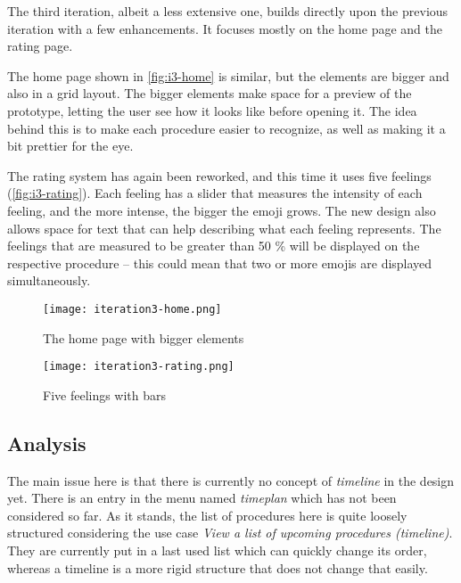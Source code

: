 The third iteration, albeit a less extensive one, builds directly upon the previous iteration with a few enhancements. It focuses mostly on the home page and the rating page.

The home page shown in \autoref{fig:i3-home} is similar, but the elements are bigger and also in a grid layout. The bigger elements make space for a preview of the prototype, letting the user see how it looks like before opening it. The idea behind this is to make each procedure easier to recognize, as well as making it a bit prettier for the eye.

The rating system has again been reworked, and this time it uses five feelings (\autoref{fig:i3-rating}). Each feeling has a slider that measures the intensity of each feeling, and the more intense, the bigger the emoji grows. The new design also allows space for text that can help describing what each feeling represents. The feelings that are measured to be greater than 50 \% will be displayed on the respective procedure -- this could mean that two or more emojis are displayed simultaneously.

\begin{sidewaysfigure}
    \centering
    \hspace{\fill}
    \begin{minipage}{0.4\textwidth}
        \centering
        \texttt{[image: iteration3-home.png]}
        \caption{The home page with bigger elements}
        \label{fig:i3-home}
    \end{minipage}
    \hspace{\fill}
    \begin{minipage}{0.4\textwidth}
        \centering
        \texttt{[image: iteration3-rating.png]}
        \caption{Five feelings with bars}
        \label{fig:i3-rating}
    \end{minipage}
    \hspace*{\fill}
\end{sidewaysfigure}

\subsection{Analysis}

The main issue here is that there is currently no concept of \emph{timeline} in the design yet. There is an entry in the menu named \emph{timeplan} which has not been considered so far. As it stands, the list of procedures here is quite loosely structured considering the use case \emph{View a list of upcoming procedures (timeline)}. They are currently put in a last used list which can quickly change its order, whereas a timeline is a more rigid structure that does not change that easily.

